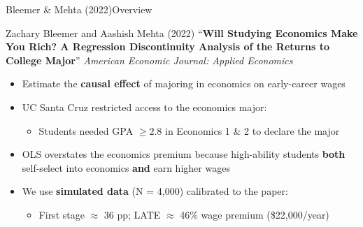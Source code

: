 \documentclass[dvipsnames,hyperref={pdfpagelabels=false}]{beamer}
\begin{document}
\author
{}

\institute{}

\date
{}

\begin{frame}{}
	\titlepage
\end{frame}


\begin{frame}{Bleemer \& Mehta (2022)}{Overview}

	Zachary Bleemer and Aashish Mehta (2022) ``\textbf{Will Studying Economics Make You Rich? A Regression Discontinuity Analysis of the Returns to College Major}'' \textit{American Economic Journal: Applied Economics}

	\vspace{0.2cm}
	\begin{itemize}
		\item Estimate the \textbf{causal effect} of majoring in economics on early-career wages
		\vspace{0.2cm}
		\item UC Santa Cruz restricted access to the economics major:
		\begin{itemize}
			\vspace{0.2cm}
			\item Students needed GPA $\geq 2.8$ in Economics 1 \& 2 to declare the major
			\vspace{0.2cm}
		\end{itemize}
		\item OLS overstates the economics premium because high-ability students
		\textbf{both} self-select into economics \textbf{and} earn higher wages
		\vspace{0.2cm}
		\item We use \textbf{simulated data} (N = 4,000) calibrated to the paper:
		\begin{itemize}
			\vspace{0.2cm}
			\item First stage $\approx$ 36 pp; LATE $\approx$ 46\% wage premium (\$22,000/year)
		\end{itemize}
	\end{itemize}
\end{frame}
\end{document}
